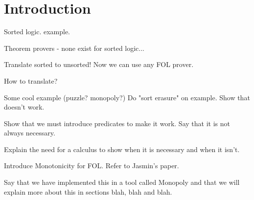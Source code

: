 
\section{Introduction}

Sorted logic. example.

Theorem provers - none exist for sorted logic...

Translate sorted to unsorted! Now we can use any FOL prover.

How to translate?

Some cool example (puzzle? monopoly?)
Do "sort erasure" on example. Show that doesn't work.

Show that we must introduce predicates to make it work.
Say that it is not always necessary.

Explain the need for a calculus to show when it is necessary and when 
it isn't.

Introduce Monotonicity for FOL. Refer to Jasmin's paper.

Say that we have implemented this in a tool called Monopoly and 
that we will explain more about this in sections blah, blah and blah.










